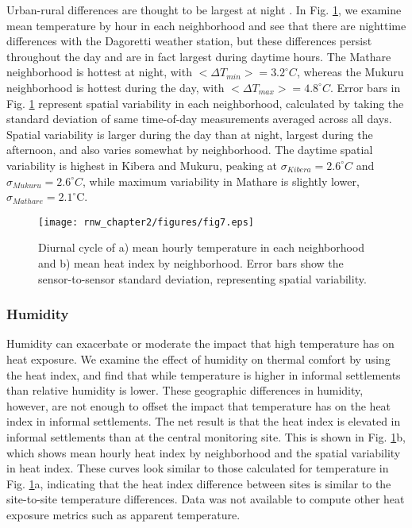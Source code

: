 Urban-rural differences are thought to be largest at night \cite{oke}. In Fig. \ref{diurnal}, we examine mean temperature by hour in each neighborhood and see that there are nighttime differences with the Dagoretti weather station, but these differences persist throughout the day and are in fact largest during daytime hours. 
The Mathare neighborhood is hottest at night, with $< \Delta T_{min}> = 3.2^\circ C$, whereas the Mukuru neighborhood is hottest during the day, with $< \Delta T_{max}> = 4.8^\circ C$. Error bars in Fig. \ref{diurnal} represent spatial variability in each neighborhood, calculated by taking the standard deviation of same time-of-day measurements averaged across all days. Spatial variability is larger during the day than at night, largest during the afternoon, and also varies somewhat by neighborhood. 
The daytime spatial variability is highest in Kibera and Mukuru, peaking at $\sigma_{Kibera} =2.6^\circ C$ and $\sigma_{Mukuru} = 2.6 ^\circ C$, while maximum variability in Mathare is slightly lower, $\sigma_{Mathare} = 2.1^ \circ  $C. %

\begin{figure}
\centering
\texttt{[image: rnw\_chapter2/figures/fig7.eps]}
\caption{%
Diurnal cycle of a) mean hourly temperature in each neighborhood and b) mean heat index by neighborhood. Error bars show the sensor-to-sensor standard deviation, representing spatial variability. }
\label{diurnal}
\end{figure}

\subsubsection{Humidity}
Humidity can exacerbate or moderate the impact that high temperature has on heat exposure.  We examine the effect of humidity on thermal comfort by using the heat index, and find that while temperature is higher in informal settlements than relative humidity is lower.
These geographic differences in humidity, however, are not enough to offset the impact that temperature has on the heat index in informal settlements. The net result is that the heat index is elevated in informal settlements than at the central monitoring site.
This is shown in Fig. \ref{diurnal}b, which shows mean hourly heat index by neighborhood and the spatial variability in heat index. These curves look similar to those calculated for temperature in Fig. \ref{diurnal}a, indicating that the heat index difference between sites is similar to the site-to-site temperature differences. Data was not available to compute other heat exposure metrics such as apparent temperature. 

